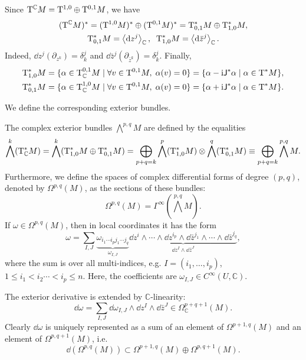 Since $\mathrm{T}^\mathbb{C}M=\mathrm{T}^{1,0}\oplus \mathrm{T}^{0,1}M$, we have
\begin{gather}
    (\mathrm{T}^\mathbb{C}M)^\ast=(\mathrm{T}^{1,0}M)^\ast \oplus (\mathrm{T}^{0,1}M)^\ast=\mathrm{T}^\ast_{0,1}M\oplus \mathrm{T}^\ast_{1,0}M,\\ \mathrm{T}^\ast_{0,1}M=\left\langle{\mathrm{d}} z^j\right\rangle_{\mathbb{C}},\;\; \mathrm{T}^\ast_{1,0}M=\left\langle{\mathrm{d}}\bar z^j\right\rangle_{\mathbb{C}}.
\end{gather}
Indeed, $\dd z^j(\partial_{z^k})=\delta^j_k$ and $\dd \bar z^j (\partial_{\bar z^k})=\delta^j_k$.
Finally, 
\begin{align}
    \mathrm{T}^\ast_{1,0}M=\{\alpha\in \mathrm{T}^{0,1}_{\mathbb{C}}M\mid \forall v\in \mathrm{T}^{0,1}M,\; \alpha(v)=0\}=\{\alpha-\mathrm{i}\mathsf{J}^\ast\alpha\mid \alpha\in \mathrm{T}^\ast M\},\\
    \mathrm{T}^\ast_{0,1}M=\{\alpha\in \mathrm{T}^{1,0}_{\mathbb{C}}M\mid \forall v\in \mathrm{T}^{0,1}M,\; \alpha(v)=0\}=\{\alpha+\mathrm{i}\mathsf{J}^\ast\alpha\mid \alpha\in \mathrm{T}^\ast M\}.
\end{align}

We define the corresponding exterior bundles.

\begin{defn}
    The complex exterior bundles $\bigwedge^{p,q}M$ are defined by the equalities \[\bigwedge^k(\mathrm{T}^\ast_\mathbb{C}M)=\bigwedge^k(\mathrm{T}^\ast_{1,0}M\oplus \mathrm{T}^\ast_{0,1}M)=\bigoplus_{p+q=k}\bigwedge^p(\mathrm{T}^\ast_{1,0}M)\otimes \bigwedge^q(\mathrm{T}^\ast_{0,1}M)\equiv \bigoplus_{p+q=k}\bigwedge^{p,q}M.\]
    Furthermore, we define the spaces of complex differential forms of degree $(p,q)$, denoted by $\Omega^{p,q}(M)$, as the sections of these bundles:
    \[\Omega^{p,q}(M)=\Gamma^\infty(\bigwedge^{p,q}M).\]
    If $\omega\in\Omega^{p,q}(M)$, then in local coordinates it has the form
    \[\omega=\sum_{I,J}\underbrace{\omega_{i_1\cdots i_pj_1\cdots j_q}}_{\omega_{I,J}}\underbrace{\dd z^i\wedge\cdots\wedge \dd z^{i_p}\wedge\dd \bar z^{j_1}\wedge\cdots\wedge \dd\bar z^{j_q}}_{\dd z^I\wedge \dd\bar z^J},\]
    where the sum is over all multi-indices, e.g. $I=(i_1,\ldots,i_p)$, $1\leq i_1<i_2\cdots<i_p\leq n$. Here, the coefficients are $\omega_{I,J}\in C^\infty (U,\mathbb{C})$.
\end{defn}

 The exterior derivative is extended by $\mathbb{C}$-linearity:
    \[\dd \omega=\sum_{I,J}\dd\omega_{I,J}\wedge\dd z^I\wedge\dd \bar z^J\in\Omega^{p+q+1}_\mathbb{C}(M).\]
Clearly $\dd\omega$ is uniquely represented as a sum of an element of $\Omega^{p+1,q}(M)$ and an element of $\Omega^{p,q+1}(M)$, i.e.
\[\dd(\Omega^{p,q}(M))\subset \Omega^{p+1,q}(M)\oplus\Omega^{p,q+1}(M).\]


